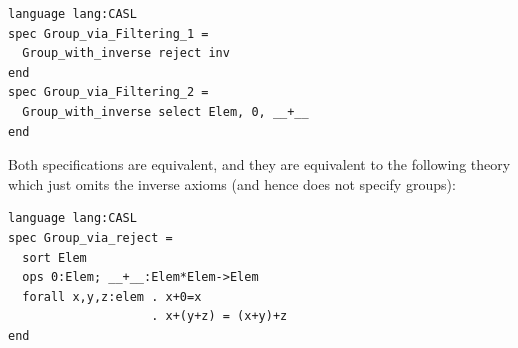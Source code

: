 \documentclass[10pt,fleqn,final]{scrreprt}
\begin{document}
\begin{lstlisting}[basicstyle=\ttfamily,language=dolText,alsolanguage=CASL,escapechar=@,mathescape]
language lang:CASL
spec Group_via_Filtering_1 =
  Group_with_inverse reject inv
end
spec Group_via_Filtering_2 =
  Group_with_inverse select Elem, 0, __+__
end
\end{lstlisting}
Both specifications are equivalent, and they are equivalent 
to the following theory which just omits the inverse
axioms (and hence does not specify groups):
\begin{lstlisting}[basicstyle=\ttfamily,language=dolText,alsolanguage=CASL,escapechar=@,mathescape]
language lang:CASL
spec Group_via_reject =
  sort Elem
  ops 0:Elem; __+__:Elem*Elem->Elem
  forall x,y,z:elem . x+0=x
                    . x+(y+z) = (x+y)+z
end
\end{lstlisting}
\end{document}
